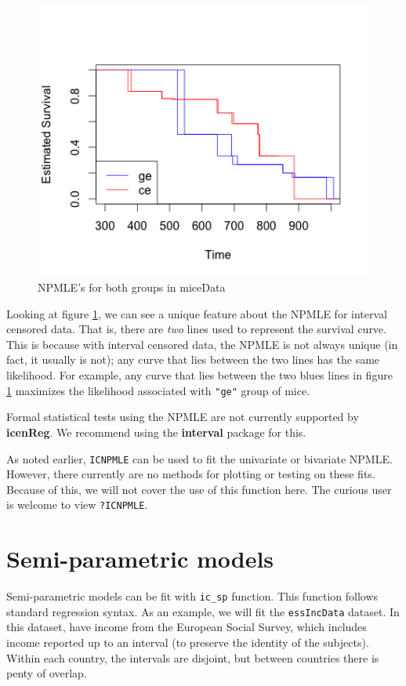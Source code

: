 \documentclass[11pt]{report}
\begin{document}
  \begin{figure}
  \centerline{\includegraphics{MICE_NPMLES.png}}
  \caption[MICE NPMLE]{NPMLE's for both groups in miceData} 
  \label{figure:MICE}
  \end{figure}

  Looking at figure \ref{figure:MICE}, we can see a unique feature about the NPMLE for 
  interval censored data. That is, there are \emph{two} lines used to represent
  the survival curve. This is because with interval censored data, the NPMLE
  is not always unique (in fact, it usually is not); any curve that lies between
  the two lines has the same likelihood. For example, any curve that lies between
  the two blues lines in figure \ref{figure:MICE} maximizes the likelihood 
  associated with \texttt{"ge"} group of mice. 

  Formal statistical tests using the NPMLE are not currently supported by 
{\bf icenReg}. We recommend using the {\bf interval} package for this. 

  As noted earlier, \texttt{ICNPMLE} can be used to fit the univariate
  or bivariate NPMLE. However, there currently are no methods for plotting
  or testing on these fits. Because of this, we will not cover the use of this
  function here. The curious user is welcome to view \texttt{?ICNPMLE}.

  \section{Semi-parametric models}

  Semi-parametric models can be fit with \texttt{ic\_sp} function. This function
  follows standard regression syntax. As an example, we will fit the 
  \texttt{essIncData} dataset. In this dataset, have income from the European
  Social Survey, which includes income reported up to an interval (to preserve
  the identity of the subjects). Within each country, the intervals are disjoint,
  but between countries there is penty of overlap. 
  
\end{document}
